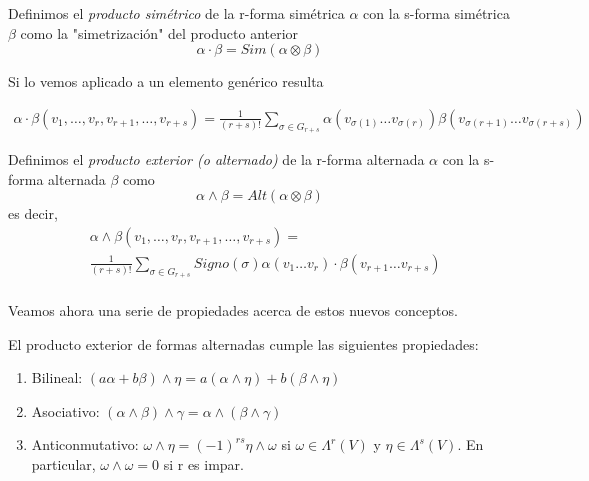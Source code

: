 \documentclass[../VD.tex]{subfiles}
\begin{document}
\begin{definition}
Definimos el \emph{producto simétrico} de la r-forma simétrica \( \alpha \) con la s-forma simétrica \( \beta \) como la "simetrización" del producto anterior
\[
\alpha\cdot\beta=Sim(\alpha\otimes\beta)
\]
\end{definition}

Si lo vemos aplicado a un elemento genérico resulta

\begin{align*}
  \alpha \cdot \beta(v_1,\dots,v_r,v_{r+1},\dots,v_{r+s})
  =
  \frac{1}{(r+s)!}
  \sum_{\sigma\in G_{r+s}}
  \alpha(v_{\sigma(1)}\dots v_{\sigma(r)})
  \beta(v_{\sigma(r+1)}\dots v_{\sigma(r+s)})
\end{align*}

\begin{definition}
Definimos el \emph{producto exterior (o alternado)} de la r-forma alternada \( \alpha \) con la s-forma alternada \( \beta \) como
\[
\alpha\wedge\beta=Alt(\alpha\otimes\beta)
\]
es decir,
\begin{align*}
&\alpha\wedge\beta(v_1,\ldots,v_r,v_{r+1},\ldots,v_{r+s})=\\
&\frac{1}{(r+s)!}\sum_{\sigma\in G_{r+s}}Signo(\sigma)\alpha(v_1\ldots v_r)\cdot\beta(v_{r+1}\ldots v_{r+s})\\
\end{align*}
\end{definition}

Veamos ahora una serie de propiedades acerca de estos nuevos conceptos.

\begin{proposition}\label{prop:ext-proper}
El producto exterior de formas alternadas cumple las siguientes propiedades:
\begin{enumerate}
\item Bilineal: \( (a\alpha+b\beta)\wedge \eta=a(\alpha\wedge\eta)+b(\beta\wedge\eta) \)
\item Asociativo: \( (\alpha\wedge\beta)\wedge \gamma=\alpha\wedge(\beta\wedge\gamma) \)
\item Anticonmutativo: \( \omega\wedge\eta=(-1)^{rs}\eta\wedge\omega \) si \( \omega\in \Lambda^r(V) \) y \( \eta\in \Lambda^s(V) \). En particular, \( \omega\wedge\omega=0 \) si r es impar.
\end{enumerate}
\end{proposition}
\end{document}
